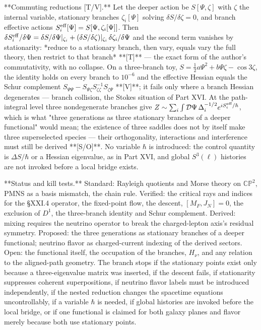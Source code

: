 **Commuting reductions [T/V].** Let the deeper action be $S[\Psi,\zeta]$ with $\zeta$ the internal variable, stationary branches $\zeta_i[\Psi]$ solving $\delta S/\delta\zeta = 0$, and branch effective actions $S^{\rm eff}_i[\Psi] = S[\Psi,\zeta_i[\Psi]]$. Then $\delta S^{\rm eff}_i/\delta\Psi = \delta S/\delta\Psi|_{\zeta_i}+(\delta S/\delta\zeta)|_{\zeta_i}\,\delta\zeta_i/\delta\Psi$ and the second term vanishes by stationarity: *reduce to a stationary branch, then vary, equals vary the full theory, then restrict to that branch* **[T]** — the exact form of the author's commutativity, with no collapse. On a three-branch toy, $S = \tfrac12a\Psi^2+b\Psi\zeta-\cos3\zeta$, the identity holds on every branch to $10^{-6}$ and the effective Hessian equals the Schur complement $S_{\Psi\Psi}-S_{\Psi\zeta}S_{\zeta\zeta}^{-1}S_{\zeta\Psi}$ **[V]**; it fails only where a branch Hessian degenerates — branch collision, the Stokes situation of Part XVI. At the path-integral level three nondegenerate branches give $Z\sim\sum_i\int\mathcal D\Psi\,\Delta_i^{-1/2}e^{iS^{\rm eff}_i/\hbar}$, which is what "three generations as three stationary branches of a deeper functional" would mean; the existence of three saddles does not by itself make three superselected species — their orthogonality, interactions and interference must still be derived **[S/O]**. No variable $\hbar$ is introduced: the control quantity is $\Delta S/\hbar$ or a Hessian eigenvalue, as in Part XVI, and global $S^3(\ell)$ histories are not invoked before a local bridge exists.

**Status and kill tests.** Standard: Rayleigh quotients and Morse theory on $\mathbb{CP}^2$, PMNS as a basis mismatch, the chain rule. Verified: the critical rays and indices for the §XXI.4 operator, the fixed-point flow, the descent, $[M_F,J_N] = 0$, the exclusion of $D^1$, the three-branch identity and Schur complement. Derived: mixing requires the neutrino operator to break the charged-lepton axis's residual symmetry. Proposed: the three generations as stationary branches of a deeper functional; neutrino flavor as charged-current indexing of the derived sectors. Open: the functional itself, the occupation of the branches, $H_\nu$, and any relation to the aligned-path geometry. The branch stops if the stationary points exist only because a three-eigenvalue matrix was inserted, if the descent fails, if stationarity suppresses coherent superpositions, if neutrino flavor labels must be introduced independently, if the nested reduction changes the spacetime equations uncontrollably, if a variable $\hbar$ is needed, if global histories are invoked before the local bridge, or if one functional is claimed for both galaxy planes and flavor merely because both use stationary points.

